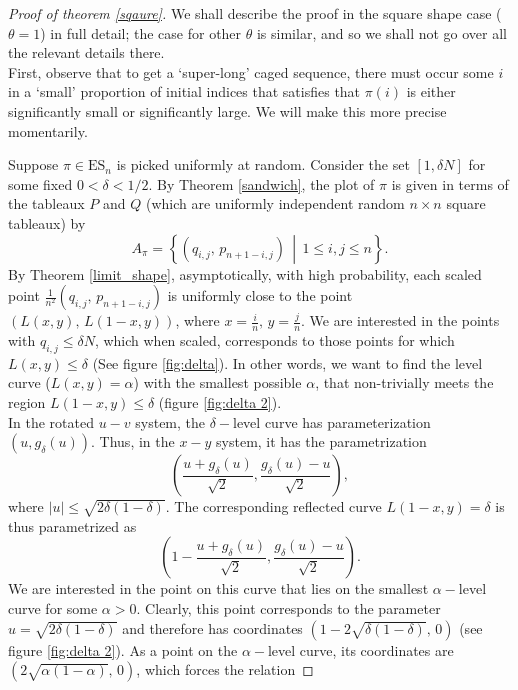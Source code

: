 \documentclass[11pt, a4paper]{article}
\theoremstyle{compact}
\begin{document}
\begin{proof}[Proof of theorem \ref{sqaure}]
We shall describe the proof in the square shape case  ($\theta=1$) in full detail; the case for other $\theta$ is similar, and so we shall not go over all the relevant details there.\\

First, observe that to get a `super-long' caged sequence, there must occur some $i$ in a `small' proportion of initial indices that satisfies that $\pi(i)$ is either significantly small or significantly large. We will make this more precise momentarily.

Suppose $\pi \in \mathrm{ES}_n$ is picked  uniformly at random. Consider the set $[1, \delta N]$ for some fixed $0<\delta < 1/2$. By Theorem \ref{sandwich}, the plot of $\pi$ is given in terms of the tableaux $P$ and $Q$ (which are uniformly independent random $n \times n$ square tableaux) by 
\[
A_\pi = \left\{ (q_{i,j}, \, p_{n+1-i, j}) \, \middle\vert \, 1 \leq i, j \leq n \right\}.
\]
By Theorem \ref{limit_shape}, asymptotically, with high probability, each scaled point $\displaystyle \frac{1}{n^2}(q_{i,j}, \, p_{n+1-i, j})$ is uniformly close to the point $\left(L(x, y), \, L(1-x, y)\right)$, where $x = \frac{i}{n}, \, y = \frac{j}{n}$. We are interested in the points with $q_{i, j} \leq \delta N $, which when scaled, corresponds to those points for which $L(x, y) \leq \delta$ (See figure \ref{fig:delta}). In other words, we want to find the level curve ($L(x, y) = \alpha$) with the smallest possible $\alpha$, that non-trivially meets the region $L(1-x, y) \leq \delta$ (figure \ref{fig:delta 2}). \\
In the rotated $u-v$ system, the $\delta-$level curve has parameterization $\left(u, g_{\delta}(u)\right) $. Thus, in the $x-y$ system, it has the parametrization
\[
\left( \frac{u+g_\delta(u)}{\sqrt{2}}, \frac{g_\delta(u)-u}{\sqrt{2}} \right),
\]where $|u| \leq \sqrt{2\delta(1-\delta)}$. The corresponding reflected curve $L(1-x, y) = \delta$ is thus parametrized as 
\[
\left( 1-\frac{u+g_\delta(u)}{\sqrt{2}}, \frac{g_\delta(u)-u}{\sqrt{2}} \right).
\] We are interested in the point on this curve that lies on the smallest $\alpha-$level curve for some $\alpha>0$. Clearly, this point corresponds to the parameter $u = \sqrt{2\delta(1-\delta)}$ and therefore has coordinates $\left( 1- 2\sqrt{\delta(1-\delta)}, \,  0 \right)$ (see figure \ref{fig:delta 2}). As a point on the $\alpha-$level curve, its coordinates are $\left(  2\sqrt{\alpha(1-\alpha)}, \,  0 \right)$, which forces the relation 

\end{proof}
\end{document}
